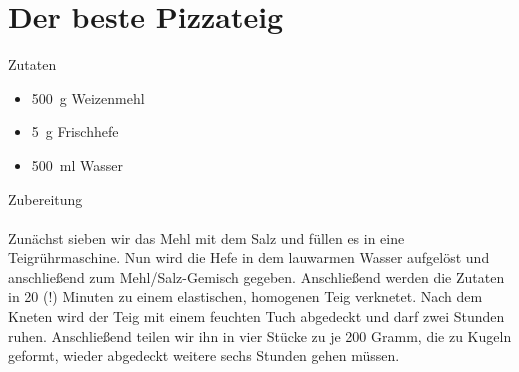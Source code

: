 \section*{Der beste Pizzateig}
\ihead{}\ohead{}
\cfoot{}
{\Large Zutaten}
\begin{multicols}{2}
\begin{itemize}
    \item \SI{500}{g} Weizenmehl
    \item \SI{5}{g} Frischhefe
    \item \SI{500}{ml} Wasser
\end{itemize}
\end{multicols}
\noindent
{\Large Zubereitung}\\
\\
Zunächst sieben wir das Mehl mit dem Salz und füllen es in eine Teigrührmaschine.
Nun wird die Hefe in dem lauwarmen Wasser aufgelöst und anschließend zum Mehl/Salz-Gemisch gegeben.
Anschließend werden die Zutaten in 20 (!) Minuten zu einem elastischen, homogenen Teig verknetet.
Nach dem Kneten wird der Teig mit einem feuchten Tuch abgedeckt und darf zwei Stunden ruhen.
Anschließend teilen wir ihn in vier Stücke zu je 200 Gramm, die zu Kugeln geformt, wieder abgedeckt weitere sechs Stunden gehen müssen.
